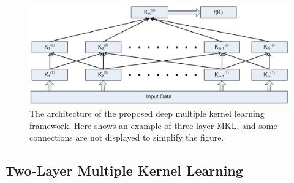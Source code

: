 \begin{figure}[htp]\label{fig:example}
\vspace{-0.1in}
\begin{center}
\includegraphics[width=\linewidth]{figures/dmkl.eps}
\end{center}\vspace{-0.2in}
\caption{The architecture of the proposed deep multiple kernel learning framework. Here shows an example of three-layer MKL, and some connections are not displayed to simplify the figure.}
\label{fig:dmkl}%
\end{figure}

\subsection{Two-Layer Multiple Kernel Learning}

